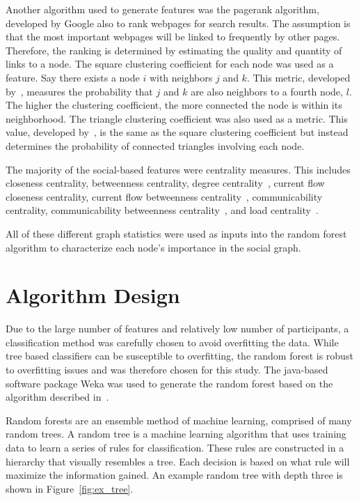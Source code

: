 \documentclass[12pt]{report}
\begin{document}
Another algorithm used to generate features was the pagerank algorithm, developed by Google \cite{page_pagerank_1999} also to rank webpages for search results.
The assumption is that the most important webpages will be linked to frequently by other pages.
Therefore, the ranking is determined by estimating the quality and quantity of links to a node.
The square clustering coefficient for each node was used as a feature.
Say there exists a node $i$ with neighbors $j$ and $k$.
This metric, developed by~\cite{lind_cycles_2005}, measures the probability that $j$ and $k$ are also neighbors to a fourth node, $l$.
The higher the clustering coefficient, the more connected the node is within its neighborhood.
The triangle clustering coefficient was also used as a metric.
This value, developed by~\cite{saramaki_generalizations_2007}, is the same as the square clustering coefficient but instead determines the probability of connected triangles involving each node.

The majority of the social-based features were centrality measures.
This includes closeness centrality, betweenness centrality, degree centrality~\cite{borgatti2011analyzing}, current flow closeness centrality, current flow betweenness centrality~\cite{brandes2005centrality}, communicability centrality, communicability betweenness centrality~\cite{estrada2008communicability}, and load centrality~\cite{newman2001scientific}.

All of these different graph statistics were used as inputs into the random forest algorithm to characterize each node's importance in the social graph.


\chapter{Algorithm Design} \label{Algorithm}
Due to the large number of features and relatively low number of participants, a classification method was carefully chosen to avoid overfitting the data.
While tree based classifiers can be susceptible to overfitting, the random forest is robust to overfitting issues and was therefore chosen for this study.
The java-based software package Weka was used to generate the random forest based on the algorithm described in~\cite{Breiman2001}.

Random forests are an ensemble method of machine learning, comprised of many random trees.
A random tree is a machine learning algorithm that uses training data to learn a series of rules for classification.
These rules are constructed in a hierarchy that visually resembles a tree.
Each decision is based on what rule will maximize the information gained.
An example random tree with depth three is shown in Figure~\ref{fig:ex_tree}.
\end{document}
